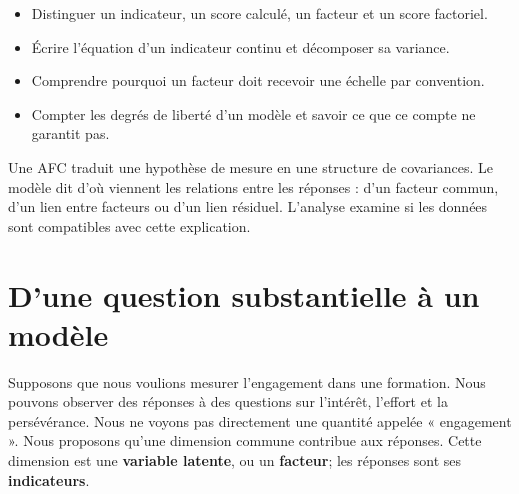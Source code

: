 \documentclass[
  french,
  11pt,
  a4paper,
  DIV=11,
  numbers=noendperiod]{scrreprt}
\providecommand{\tightlist}{%
  \setlength{\itemsep}{0pt}\setlength{\parskip}{0pt}}
\begin{document}
\begin{tcolorbox}[enhanced jigsaw, arc=.35mm, bottomrule=.15mm, bottomtitle=1mm, breakable, colback=white, colbacktitle=quarto-callout-note-color!10!white, colframe=quarto-callout-note-color-frame, coltitle=black, left=2mm, leftrule=.75mm, opacityback=0, opacitybacktitle=0.6, rightrule=.15mm, title={Objectifs du chapitre}, titlerule=0mm, toprule=.15mm, toptitle=1mm]

\begin{itemize}
\tightlist
\item
  Distinguer un indicateur, un score calculé, un facteur et un score
  factoriel.
\item
  Écrire l'équation d'un indicateur continu et décomposer sa variance.
\item
  Comprendre pourquoi un facteur doit recevoir une échelle par
  convention.
\item
  Compter les degrés de liberté d'un modèle et savoir ce que ce compte
  ne garantit pas.
\end{itemize}

\end{tcolorbox}

\begin{tcolorbox}[enhanced jigsaw, arc=.35mm, bottomrule=.15mm, bottomtitle=1mm, breakable, colback=white, colbacktitle=quarto-callout-tip-color!10!white, colframe=quarto-callout-tip-color-frame, coltitle=black, left=2mm, leftrule=.75mm, opacityback=0, opacitybacktitle=0.6, rightrule=.15mm, title={Idée centrale}, titlerule=0mm, toprule=.15mm, toptitle=1mm]

Une AFC traduit une hypothèse de mesure en une structure de covariances.
Le modèle dit d'où viennent les relations entre les réponses : d'un
facteur commun, d'un lien entre facteurs ou d'un lien résiduel.
L'analyse examine si les données sont compatibles avec cette
explication.

\end{tcolorbox}

\section{D'une question substantielle à un
modèle}\label{dune-question-substantielle-uxe0-un-moduxe8le}

Supposons que nous voulions mesurer l'engagement dans une formation.
Nous pouvons observer des réponses à des questions sur l'intérêt,
l'effort et la persévérance. Nous ne voyons pas directement une quantité
appelée « engagement ». Nous proposons qu'une dimension commune
contribue aux réponses. Cette dimension est une \textbf{variable
latente}, ou un \textbf{facteur}; les réponses sont ses
\textbf{indicateurs}.
\end{document}
